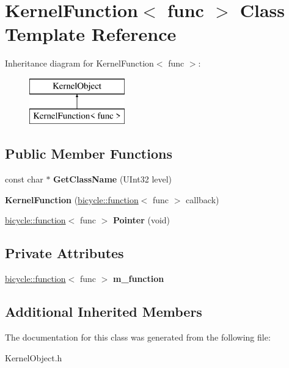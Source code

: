 \hypertarget{class_kernel_function}{}\section{Kernel\+Function$<$ func $>$ Class Template Reference}
\label{class_kernel_function}
Inheritance diagram for Kernel\+Function$<$ func $>$\+:\begin{figure}[H]
\begin{center}
\leavevmode
\includegraphics[height=2.000000cm]{class_kernel_function}
\end{center}
\end{figure}
\subsection*{Public Member Functions}
\begin{DoxyCompactItemize}
\item 
\mbox{\label{class_kernel_function_a4c46af53b0fcbae995e7fe54adf4f701}} 
const char $\ast$ {\bfseries Get\+Class\+Name} (U\+Int32 level)
\item 
\mbox{\label{class_kernel_function_a0538d2a2606af767662e59173fb1b614}} 
{\bfseries Kernel\+Function} (\hyperlink{classbicycle_1_1function}{bicycle\+::function}$<$ func $>$ callback)
\item 
\mbox{\label{class_kernel_function_a7c3b2f3fa084230fa8e126e57ce64fe7}} 
\hyperlink{classbicycle_1_1function}{bicycle\+::function}$<$ func $>$ {\bfseries Pointer} (void)
\end{DoxyCompactItemize}
\subsection*{Private Attributes}
\begin{DoxyCompactItemize}
\item 
\mbox{\label{class_kernel_function_a5814ba8fab8bc77a122b157e24006e46}} 
\hyperlink{classbicycle_1_1function}{bicycle\+::function}$<$ func $>$ {\bfseries m\+\_\+function}
\end{DoxyCompactItemize}
\subsection*{Additional Inherited Members}


The documentation for this class was generated from the following file\+:\begin{DoxyCompactItemize}
\item 
Kernel\+Object.\+h\end{DoxyCompactItemize}
